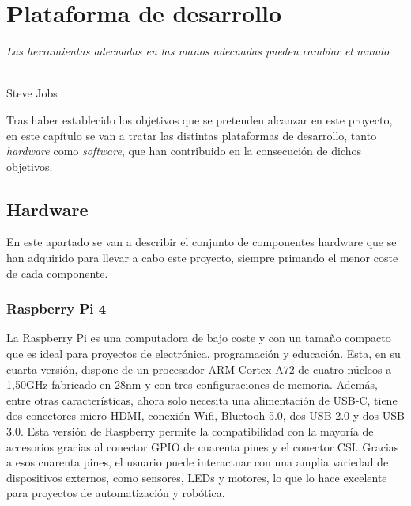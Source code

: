 \chapter{Plataforma de desarrollo}
\label{cap:capitulo4}

\begin{flushright}
\begin{minipage}[]{10cm}
\emph{Las herramientas adecuadas en las manos adecuadas pueden cambiar el mundo}\\
\end{minipage}\\

Steve Jobs\\
\end{flushright}

\vspace{1cm}

Tras haber establecido los objetivos que se pretenden alcanzar en este proyecto, en este capítulo se van a tratar las distintas plataformas de desarrollo, tanto \textit{hardware} como \textit{software}, que han contribuido en la consecución de dichos objetivos.

\section{Hardware}

En este apartado se van a describir el conjunto de componentes hardware que se han adquirido para llevar a cabo este proyecto, siempre primando el menor coste de cada componente.

\subsection{Raspberry Pi 4}

La Raspberry Pi es una computadora de bajo coste y con un tamaño compacto que es ideal para proyectos de electrónica, programación y educación. Esta, en su cuarta versión, dispone de un procesador ARM Cortex-A72 de cuatro núcleos a 1,50GHz fabricado en 28nm y con tres configuraciones de memoria. Además, entre otras características, ahora solo necesita una alimentación de USB-C, tiene dos conectores micro HDMI, conexión Wifi, Bluetooh 5.0, dos USB 2.0 y dos USB 3.0. Esta versión de Raspberry permite la compatibilidad con la mayoría de accesorios gracias al conector GPIO de cuarenta pines y el conector \ac{CSI}. Gracias a esos cuarenta pines, el usuario puede interactuar con una amplia variedad de dispositivos externos, como sensores, LEDs y motores, lo que lo hace excelente para proyectos de automatización y robótica. 


